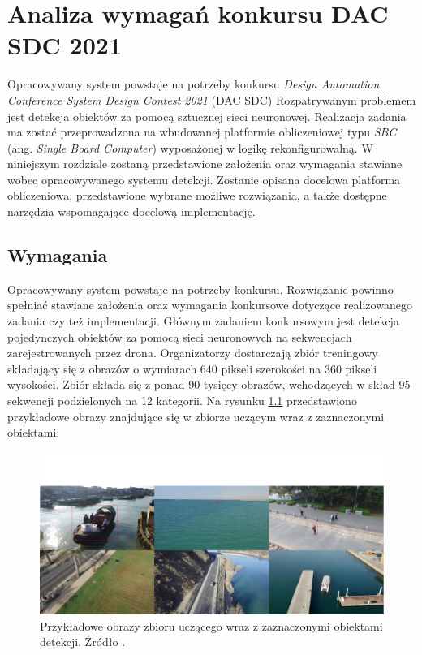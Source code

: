 \chapter{Analiza wymagań konkursu DAC SDC 2021}
\label{cha:Analiza probemu}

Opracowywany system powstaje na potrzeby konkursu \emph{Design Automation Conference System Design Contest 2021} (DAC SDC)
Rozpatrywanym problemem jest detekcja obiektów za pomocą sztucznej sieci neuronowej.
Realizacja zadania ma zostać przeprowadzona na wbudowanej platformie obliczeniowej typu \emph{SBC} (ang. \emph{Single Board Computer}) wyposażonej w logikę rekonfigurowalną.
W niniejszym rozdziale zostaną przedstawione założenia oraz wymagania stawiane wobec opracowywanego systemu detekcji.
Zostanie opisana docelowa platforma obliczeniowa, przedstawione wybrane możliwe rozwiązania, 
a także dostępne narzędzia wspomagające docelową implementację.


\section{Wymagania}
Opracowywany system powstaje na potrzeby konkursu.
Rozwiązanie powinno spełniać stawiane założenia oraz wymagania konkursowe dotyczące realizowanego zadania czy też implementacji.
Głównym zadaniem konkursowym jest detekcja pojedynczych obiektów za pomocą sieci neuronowych na sekwencjach zarejestrowanych przez drona.
Organizatorzy dostarczają zbiór treningowy składający się z obrazów o wymiarach 640 pikseli szerokości na 360 pikseli wysokości. Zbiór składa się z ponad 90 tysięcy obrazów, wchodzących w skład 95 sekwencji podzielonych na 12 kategorii. Na rysunku \ref{fig:sample_images} przedstawiono przykładowe obrazy znajdujące się w zbiorze uczącym wraz z zaznaczonymi obiektami.
\begin{figure}
    \centering
    \includegraphics[width=\linewidth]{images/sample_images.png}
    \caption{Przykładowe obrazy zbioru uczącego wraz z zaznaczonymi obiektami detekcji. Źródło \cite{dac_sdc_2021}.}
    \label{fig:sample_images}
\end{figure}

